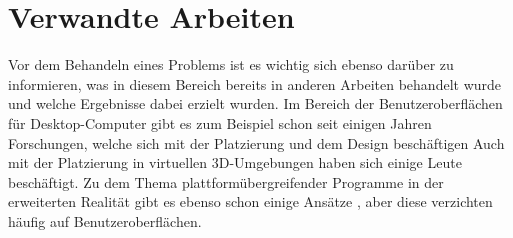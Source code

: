 
\chapter{Verwandte Arbeiten}\label{chapter:background}
	

	
		
		
		
		
		
	Vor dem Behandeln eines Problems ist es wichtig sich ebenso darüber zu informieren, was in diesem Bereich bereits in anderen Arbeiten behandelt wurde und welche Ergebnisse dabei erzielt wurden.
	Im Bereich der Benutzeroberflächen für Desktop-Computer gibt es zum Beispiel schon seit einigen Jahren Forschungen, welche sich mit der Platzierung und dem Design beschäftigen
	Auch mit der Platzierung in virtuellen 3D-Umgebungen haben sich einige Leute beschäftigt. 
	Zu dem Thema plattformübergreifender Programme in der erweiterten Realität gibt es ebenso schon einige Ansätze , aber diese verzichten häufig auf Benutzeroberflächen.
		
